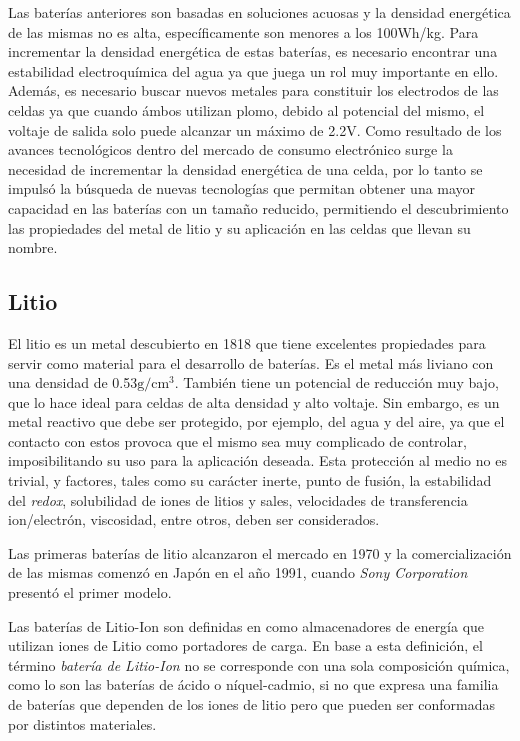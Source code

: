 \noindent Las baterías anteriores son basadas en soluciones acuosas y la
densidad energética de las mismas no es alta, espec\'ificamente son menores a
los 100Wh/kg. Para incrementar la densidad energética de estas baterías, es
necesario encontrar una estabilidad electroquímica del agua ya que juega un rol
muy importante en ello. Además, es necesario buscar nuevos metales para
constituir los electrodos de las celdas ya que cuando \'ambos utilizan plomo,
debido al potencial del mismo, el voltaje de salida solo puede alcanzar un
máximo de 2.2V. Como resultado de los avances tecnol\'ogicos dentro del mercado
de consumo electr\'onico surge la necesidad de incrementar la densidad
energética de una celda, por lo tanto se impuls\'o la b\'usqueda de nuevas
tecnolog\'ias que permitan obtener una mayor capacidad en las bater\'ias con un
tamaño reducido, permitiendo el descubrimiento las propiedades del metal de
litio y su aplicación en las celdas que llevan su nombre.

\subsection{Litio}

El litio es un metal descubierto en 1818 que tiene excelentes propiedades para
servir como material para el desarrollo de baterías. Es el metal m\'as liviano
con una densidad de 0.53$\mathrm{g/cm^3}$. Tambi\'en tiene un potencial de
reducci\'on muy bajo, que lo hace ideal para celdas de alta densidad y alto
voltaje. Sin embargo, es un metal reactivo que debe ser protegido, por ejemplo,
del agua y del aire, ya que el contacto con estos provoca que el mismo sea muy
complicado de controlar, imposibilitando su uso para la aplicación deseada. Esta
protección al medio no es trivial, y factores, tales como su carácter inerte,
punto de fusión, la estabilidad del \emph{redox}, solubilidad de iones de litios
y sales, velocidades de transferencia ion/electrón, viscosidad, entre otros,
deben ser considerados.

\noindent Las primeras baterías de litio alcanzaron el mercado en 1970 y la
comercialización de las mismas comenzó en Japón en el año 1991, cuando
\emph{Sony Corporation} presentó el primer modelo.

\noindent Las baterías de Litio-Ion son definidas en \cite{Tatsuo2014} como
almacenadores de energía que utilizan iones de Litio como portadores de carga.
En base a esta definición, el término \emph{batería de Litio-Ion} no se
corresponde con una sola composición química, como lo son las baterías de ácido
o n\'iquel-cadmio, si no que expresa una familia de baterías que dependen de los
iones de litio pero que pueden ser conformadas por distintos materiales.

